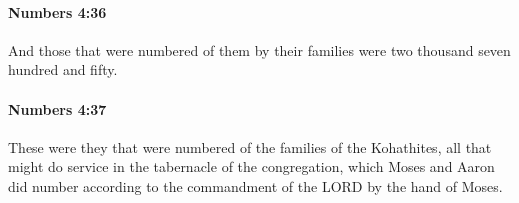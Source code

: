 		\paragraph{Numbers 4:36} %
			\label{NUMBERS-4-36}

			And those that were numbered of them by their families were two thousand seven hundred and fifty.


		\paragraph{Numbers 4:37} %
			\label{NUMBERS-4-37}

			These were they that were numbered of the families of the Kohathites, all that might do service in the tabernacle of the congregation, which Moses and Aaron did number according to the commandment of the LORD by the hand of Moses.


